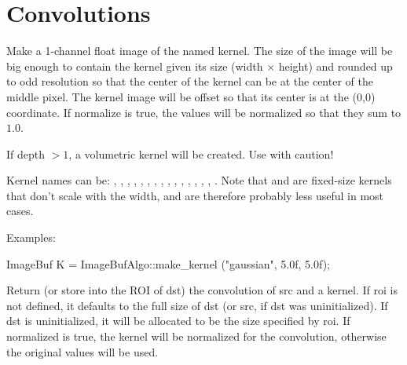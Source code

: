 \section{Convolutions}
\label{sec:iba:convolutions}

 
Make a 1-channel {\cf float} image of the named kernel.
The size of the image will be big enough to contain the kernel
given its size ({\cf width} $\times$ {\cf height})
and rounded up to odd resolution so
that the center of the kernel can be at the center of the middle
pixel.  The kernel image will be offset so that its center is at the
{\cf (0,0)} coordinate.  If {\cf normalize} is true, the values will be
normalized so that they sum to $1.0$.

If {\cf depth} $> 1$, a volumetric kernel will be created.  Use with
caution!

Kernel names can be: , , ,
, , , ,
, , , , ,
, , , . Note that
 and  are fixed-size kernels that don't
scale with the width, and are therefore probably less useful in most
cases.

\smallskip
\noindent Examples:
\begin{code}
    ImageBuf K = ImageBufAlgo::make_kernel ("gaussian", 5.0f, 5.0f);
\end{code}
\apiend


 

Return (or store into the ROI of {\cf dst}) the convolution of {\cf src} and
a kernel.  If {\cf roi} is not defined, it defaults to the full size of
{\cf dst} (or {\cf src}, if {\cf dst} was uninitialized). If {\cf dst} is
uninitialized, it will be allocated to be the size specified by {\cf roi}.
If {\cf normalized} is {\cf true}, the kernel will be normalized for the
convolution, otherwise the original values will be used.


